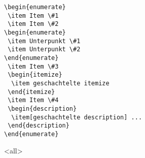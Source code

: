 \begin{frame}[fragile]
\begin{lstlisting}
\begin{enumerate}
 \item Item \#1
 \item Item \#2
\begin{enumerate}
 \item Unterpunkt \#1
 \item Unterpunkt \#2
\end{enumerate}
 \item Item \#3
 \begin{itemize}
  \item geschachtelte itemize
 \end{itemize}
 \item Item \#4
 \begin{description}
  \item[geschachtelte description] ...
 \end{description}
\end{enumerate}
\end{lstlisting}

\mode
<all>

\end{frame}
\newpage
